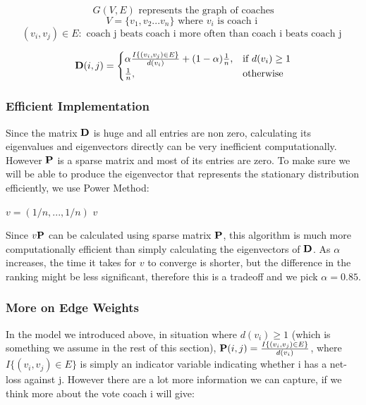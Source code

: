 \documentclass[titlepage]{article}
\begin{document}
$$G(V, E) \mbox{ represents the graph of coaches}$$
$$V = \{v_1, v_2 ... v_n\} \mbox{ where } v_i \mbox{ is coach i }$$
$$(v_i, v_j) \in E : \mbox{ coach j beats coach i more often than coach i beats coach j }$$

\[
    {\bf D} (i, j)= 
\begin{cases}
    \alpha \frac{ I\{(v_i, v_j) \in E\}}{d(v_i)} + (1-\alpha)\frac{1}{n},& \text{if } d(v_i) \geq 1\\
    \frac{1}{n},              & \text{otherwise}
\end{cases}
\]


\subsubsection*{Efficient Implementation}

Since the matrix ${\bf D}$ is huge and all entries are non zero, calculating its eigenvalues and eigenvectors directly can be very inefficient computationally. However ${\bf P}$ is a sparse matrix and most of its entries are zero. To make sure we will be able to produce the eigenvector that represents the stationary distribution efficiently, we use Power Method:

\vspace{5mm}

\begin{algorithm}[H]

$v = (1/n, ... ,1/n)$\;
\Return $v$\;
\end{algorithm}

\vspace{5mm}

\noindent Since $v {\bf P}$ can be calculated using sparse matrix ${\bf P}$, this algorithm is much more computationally efficient than simply calculating the eigenvectors of ${\bf D}$. As $\alpha$ increases, the time it takes for $v$ to converge is shorter, but the difference in the ranking might be less significant, therefore this is a tradeoff and we pick $\alpha = 0.85$.

\subsubsection*{More on Edge Weights}

\noindent In the model we introduced above, in situation where $d(v_i) \geq 1$ (which is something we assume in the rest of this section), ${\bf P}(i, j) = \frac{ I\{(v_i, v_j) \in E\}}{d(v_i)}$, where $I\{(v_i, v_j) \in E\}$ is simply an indicator variable indicating whether i has a net-loss against j. However there are a lot more information we can capture, if we think more about the vote coach i will give:
\end{document}
